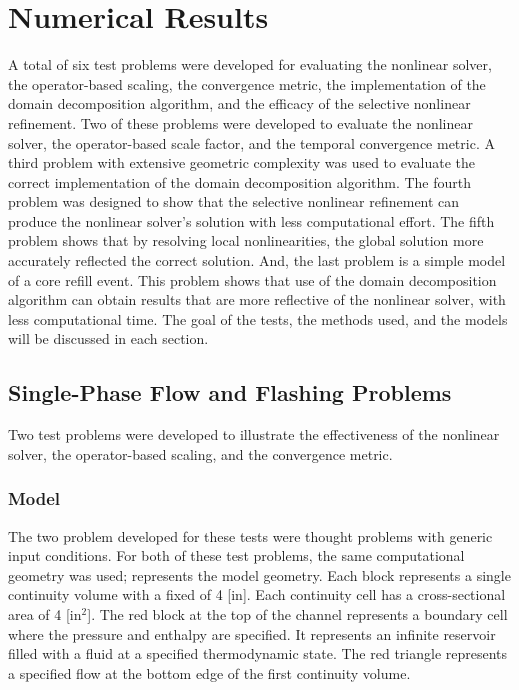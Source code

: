 \chapter{Numerical Results}
\label{chap:results}

A total of six test problems were developed for evaluating the nonlinear solver, the operator-based scaling, the convergence metric, the implementation of the domain decomposition algorithm, and the efficacy of the selective nonlinear refinement.
Two of these problems were developed to evaluate the nonlinear solver, the operator-based scale factor, and the temporal convergence metric.
A third problem with extensive geometric complexity was used to evaluate the correct implementation of the domain decomposition algorithm.
The fourth problem was designed to show that the selective nonlinear refinement can produce the nonlinear solver's solution with less computational effort.
The fifth problem shows that by resolving local nonlinearities, the global solution more accurately reflected the correct solution.
And, the last problem is a simple model of a core refill event.
This problem shows that use of the domain decomposition algorithm can obtain results that are more reflective of the nonlinear solver, with less computational time.
The goal of the tests, the methods used, and the models will be discussed in each section.

\section{Single-Phase Flow and Flashing Problems}
\label{sect:single_phase_and_flashing}

Two test problems were developed to illustrate the effectiveness of the nonlinear solver, the operator-based scaling, and the convergence metric.


\subsection{Model}
\label{subsect:single_model}
The two problem developed for these tests were thought problems with generic input conditions.
For both of these test problems, the same computational geometry was used;   represents the model geometry.
Each block represents a single continuity volume with a fixed \dx{} of 4 [in].
Each continuity cell has a cross-sectional area of 4 [in$^2$].
The red block at the top of the channel represents a boundary cell where the pressure and enthalpy are specified.
It represents an infinite reservoir filled with a fluid at a specified thermodynamic state.
The red triangle represents a specified flow at the bottom edge of the first continuity volume. 

